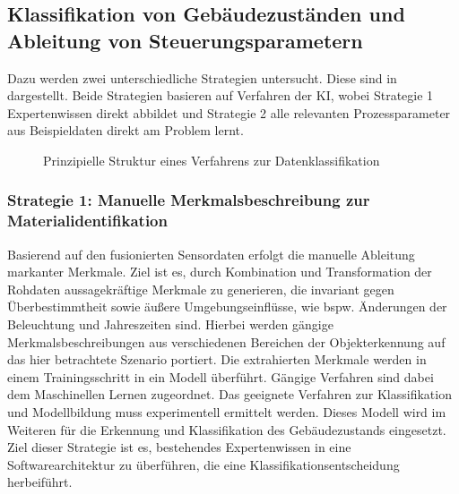 \subsection{Klassifikation von Gebäudezuständen und Ableitung von Steuerungsparametern}
Dazu werden zwei unterschiedliche Strategien untersucht. Diese sind in  dargestellt. Beide Strategien basieren auf Verfahren der KI, wobei Strategie 1 Expertenwissen direkt abbildet und Strategie 2 alle relevanten Prozessparameter aus Beispieldaten direkt am Problem lernt.

\begin{figure}[htbp]
    \centering
    \caption{\label{fig-klassi}Prinzipielle Struktur eines Verfahrens zur Datenklassifikation }
\end{figure}

\subsubsection{Strategie 1: Manuelle Merkmalsbeschreibung zur Materialidentifikation}
Basierend auf den fusionierten Sensordaten erfolgt die manuelle Ableitung markanter Merkmale. Ziel ist es, durch Kombination und Transformation der Rohdaten aussagekräftige Merkmale zu generieren, die invariant gegen Überbestimmtheit sowie äußere Umgebungseinflüsse, wie bspw. Änderungen der Beleuchtung und Jahreszeiten sind. Hierbei werden gängige Merkmalsbeschreibungen aus verschiedenen Bereichen der Objekterkennung auf das hier betrachtete Szenario portiert. Die extrahierten Merkmale werden in einem Trainingsschritt in ein Modell überführt. Gängige Verfahren sind dabei dem Maschinellen Lernen zugeordnet. Das geeignete Verfahren zur Klassifikation und Modellbildung muss experimentell ermittelt werden. Dieses Modell wird im Weiteren für die Erkennung und Klassifikation des Gebäudezustands eingesetzt. Ziel dieser Strategie ist es, bestehendes Expertenwissen in eine Softwarearchitektur zu überführen, die eine Klassifikationsentscheidung herbeiführt. 

